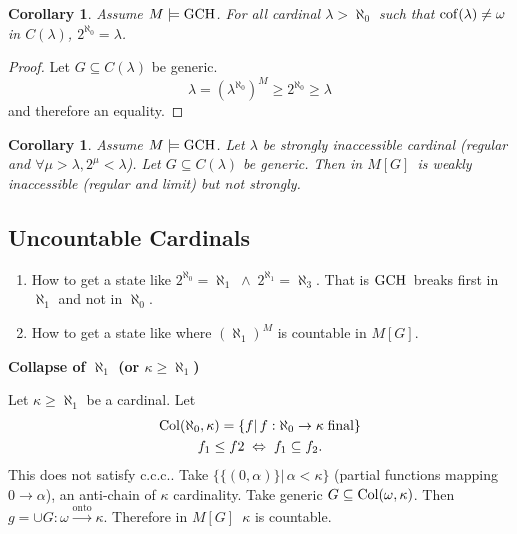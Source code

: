 \documentclass[11pt,pdftex,twoside,a4paper]{article}
\newcommand{\B}[1]{\textbf{#1}}
\newcommand{\ccc}{c.c.c.}
\newcommand{\cof}{\ensuremath{\mathop{\rm cof}\nolimits}}
\newcommand{\Col}{\ensuremath{\mathop{\rm Col}\nolimits}}
\newcommand{\GCH}{\ensuremath{\mathop{\rm GCH}\nolimits}}
\newcommand{\MG}{\ensuremath{M[G]}}
\newtheorem{corollary}[thm]{Corollary}
\theoremstyle{definition}
\begin{document}
\begin{corollary}
Assume \(M\models\GCH\).
For all cardinal \(\lambda > \aleph_0\) such that \(\cof(\lambda)\neq\omega\)
in \(C(\lambda)\), \(2^{\aleph_0} = \lambda\).
\end{corollary}
\begin{proof}
Let \(G\subseteq C(\lambda)\) be generic.
\begin{equation*}
\lambda = \left(\lambda^{\aleph_0}\right)^M \geq 2^{\aleph_0} \geq \lambda
\end{equation*}
and therefore an equality.
\end{proof}

\begin{corollary}
Assume \(M\models\GCH\). Let \(\lambda\) be
strongly inaccessible cardinal
(regular and \(\forall \mu>\lambda, 2^\mu < \lambda\)).
Let \(G\subseteq C(\lambda)\) be generic.
Then in \MG\ is weakly inaccessible (regular and limit) but not strongly.
\end{corollary}

\subsection{Uncountable Cardinals}

\begin{enumerate}[label={(\alph*)}]
\item How to get a state like
   \(2^{\aleph_0}=\aleph_1\;\land\;2^{\aleph_1}=\aleph_3\).
   That is \GCH\ breaks first in \(\aleph_1\) and not in \(\aleph_0\).
\item How to get a state like where \((\aleph_1)^M\) is countable in \MG.
\end{enumerate}

\B{Collapse of \(\aleph_1\) (or \(\kappa\geq\aleph_1\))}

Let \(\kappa \geq\aleph_1\) be a cardinal. Let
\begin{gather*}
\Col(\aleph_0,\kappa) = \{f|\, f:\aleph_0\to\kappa \;\textnormal{final}\} \\
f_1 \leq f2 \;\Leftrightarrow\; f_1 \subseteq f_2.
\end{gather*}
This does not satisfy \ccc. Take \(\{\{(0,\alpha)\}|\,\alpha<\kappa\}\)
(partial functions mapping \(0\to\alpha\)),
an anti-chain of \(\kappa\) cardinality.
Take generic \(G\subseteq\Col(\omega,\kappa)\).
Then \(g=\cup G:\omega \xrightarrow{\text{onto}} \kappa\).
Therefore in \MG\ \(\kappa\) is countable.
\end{document}
